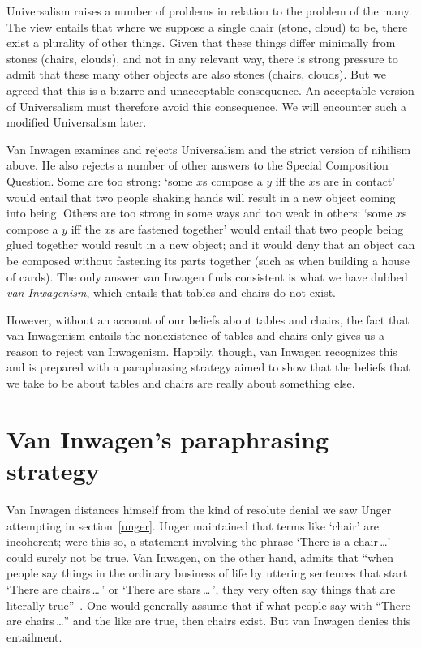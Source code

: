 \documentclass[11pt]{standalone}
\begin{document}
\begin{spacing}{1.5}
Universalism raises a number of problems in relation to the problem of
the many.  The view entails that where we suppose a single chair
(stone, cloud) to be, there exist a plurality of other things.  Given
that these things differ minimally from stones (chairs, clouds), and
not in any relevant way, there is strong pressure to admit that these
many other objects are also stones (chairs, clouds).  But we agreed
that this is a bizarre and unacceptable consequence.  An acceptable
version of Universalism must therefore avoid this consequence.  We
will encounter such a modified Universalism later.

Van Inwagen examines and rejects Universalism and the strict version
of nihilism above.  He also rejects a number of other answers to the
Special Composition Question.  Some are too strong: `some $x$s compose
a $y$ iff the $x$s are in contact' would entail that two people
shaking hands will result in a new object coming into being.  Others
are too strong in some ways and too weak in others: `some $x$s compose
a $y$ iff the $x$s are fastened together' would entail that two people
being glued together would result in a new object; and it would deny
that an object can be composed without fastening its parts together
(such as when building a house of cards).  The only answer van Inwagen
finds consistent is what we have dubbed {\em van Inwagenism}, which
entails that tables and chairs do not exist.

However, without an account of our beliefs about tables and chairs,
the fact that van Inwagenism entails the nonexistence of tables and
chairs only gives us a reason to reject van Inwagenism.  Happily,
though, van Inwagen recognizes this and is prepared with a
paraphrasing strategy aimed to show that the beliefs that we take to
be about tables and chairs are really about something else.

\section{Van Inwagen's paraphrasing strategy}
\label{inwagen}
Van Inwagen distances himself from the kind of resolute denial we saw
Unger attempting in section~\ref{unger}.  Unger maintained that terms
like `chair' are incoherent; were this so, a statement involving the
phrase `There is a chair\,\ldots ' could surely not be true.  Van
Inwagen, on the other hand, admits that ``when people say things in
the ordinary business of life by uttering sentences that start `There
are chairs\,\ldots\,' or `There are stars\,\ldots\,', they very often
say things that are literally true''~\cite[102]{inwagen1995}.  One
would generally assume that if what people say with ``There are
chairs\,\ldots '' and the like are true, then chairs exist.  But van
Inwagen denies this entailment.


\end{spacing}
\end{document}
